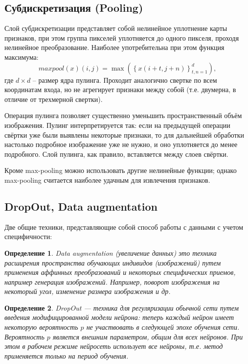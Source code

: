 \documentclass[12pt, specialist, subf, substylefile = spbu.rtx]{disser}
\newtheorem{definition}{Определение}
\begin{document}
\subsection{Субдискретизация (Pooling)}

Слой субдискретизации представляет собой нелинейное уплотнение карты признаков, при этом группа пикселей уплотняется до одного пикселя, проходя нелинейное преобразование. Наиболее употребительна при этом функция максимума:
$$
maxpool(x)(i, j)=\max\left(\left\{x(i+t,j+n)\right\}_{t,n=1}^{d}\right),
$$
где $d \times d$ -- размер ядра пулинга. Проходит аналогично свертке по всем координатам входа, но не агрегирует признаки между собой (т.е. двумерна, в отличие от трехмерной свертки).

Операция пулинга позволяет существенно уменьшить пространственный объём изображения. Пулинг интерпретируется так: если на предыдущей операции свёртки уже были выявлены некоторые признаки, то для дальнейшей обработки настолько подробное изображение уже не нужно, и оно уплотняется до менее подробного. Слой пулинга, как правило, вставляется между слоев свёртки.

Кроме max-pooling можно использовать другие нелинейные функции; однако max-pooling считается наиболее удачным для извлечения признаков.

\subsection{DropOut, Data augmentation}

Две общие техники, представляющие собой способ работы с данными с учетом специфичности:

\begin{definition}{Data augmentation}
(увеличение данных) это техника расширения пространства обучающих индивидов (изображений) путем применения аффинных преобразований и некоторых специфических приемов, например генерация изображений. Например, поворот изображения на некоторый угол, изменение размера изображения и др.
\end{definition}

\begin{definition}{DropOut}
--- техника для регуляризации обычной сети путем введения модифицированной модели нейрона: теперь каждый нейрон имеет некоторую вероятность $p$ не участвовать в следующей эпохе обучения сети. Вероятность $p$ является внешним параметром, общим для всех нейронов. При этом в рабочем режиме нейросеть использует все нейроны, т.е. метод применяется только на период обучения. 
\end{definition}
\end{document}

